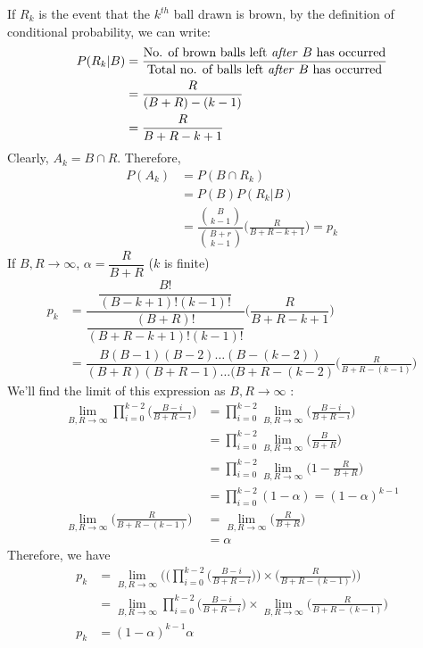 \documentclass{article}
\begin{document}
If $R_k$ is the event that the $k^{th}$ ball drawn is brown, by the definition of conditional probability, we can write:
\begin{align*}
    P(R_k|B)&=\frac{\text{No. of brown balls left \textit{after} $B$ has occurred}}{\text{Total no. of balls left \textit{after} $B$ has occurred}}\\
    &=\frac{R}{(B+R)-(k-1)}\\
    &=\frac{R}{B+R-k+1}
\end{align*}
Clearly, $A_k=B\cap R$. Therefore,
\begin{align*}
    P(A_k)&=P(B\cap R_k)\\&= P(B)P(R_k|B)\\
    &=\dfrac{{B\choose {k-1}}}{{{B+r}\choose{k-1}}}\Big(\frac{R}{B+R-k+1}\Big)=p_k
\end{align*}
If $B, R \rightarrow \infty$, $\alpha = \dfrac{R}{B+R}$ ($k$ is finite)
\begin{align}
    p_k &= \dfrac{\dfrac{B!}{(B-k+1)!(k-1)!}}{\dfrac{(B+R)!}{(B+R-k+1)!(k-1)!}}\Big(\dfrac{R}{B+R-k+1}\Big)\nonumber\\
    &=\dfrac{B(B-1)(B-2)\dots(B-(k-2))}{(B+R)(B+R-1)\dots(B+R-(k-2)}\Big(\frac{R}{B+R-(k-1)}\Big)
\end{align}
We'll find the limit of this expression as $B,R\to\infty$ :
\begin{align}
    \lim_{B,R\to \infty}\prod^{k-2}_{i=0}\Big(\frac{B-i}{B+R-i}\Big) &= \prod^{k-2}_{i=0}\lim_{B,R\to\infty}\Big(\frac{B-i}{B+R-i}\Big)\nonumber\\
    &=\prod^{k-2}_{i=0}\lim_{B,R\to\infty}\Big(\frac{B}{B+R}\Big) \nonumber\\
   &=\prod^{k-2}_{i=0}\lim_{B,R\to\infty}\Big(1-\frac{R}{B+R}\Big)\nonumber\\
   &=\prod^{k-2}_{i=0}(1-\alpha) = (1-\alpha)^{k-1}\\
   \lim_{B,R\to \infty}\Big(\frac{R}{B+R-(k-1)}\Big)
   &= \lim_{B,R\to \infty}\Big(\frac{R}{B+R}\Big)\nonumber\\
   &= \alpha
\end{align}
Therefore, we have
\begin{align*}
  p_k &= \lim_{B,R\to \infty}\Big(\Big(\prod^{k-2}_{i=0}\Big(\frac{B-i}{B+R-i}\Big)\Big)\times\Big(\frac{R}{B+R-(k-1)}\Big)\Big)\\
  &=\lim_{B,R\to \infty}\prod^{k-2}_{i=0}\Big(\frac{B-i}{B+R-i}\Big)\times\lim_{B,R\to \infty}\Big(\frac{R}{B+R-(k-1)}\Big)\\
  p_k &= (1-\alpha)^{k-1}\alpha
\end{align*}
\end{document}
